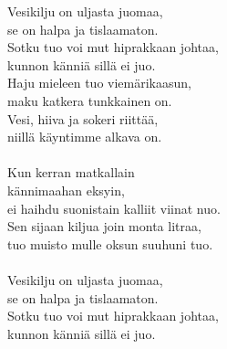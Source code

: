 
Vesikilju on uljasta juomaa, \\ se on halpa ja tislaamaton. \\ Sotku tuo voi mut hiprakkaan johtaa, \\ kunnon känniä sillä ei juo. \\ Haju mieleen tuo viemärikaasun, \\ maku katkera tunkkainen on. \\ Vesi, hiiva ja sokeri riittää, \\ niillä käyntimme alkava on. \\ \hspace{10mm} \\ Kun kerran matkallain \\ kännimaahan eksyin, \\ ei haihdu suonistain kalliit viinat nuo. \\ Sen sijaan kiljua join monta litraa, \\ tuo muisto mulle oksun suuhuni tuo. \\ \hspace{10mm} \\ Vesikilju on uljasta juomaa, \\ se on halpa ja tislaamaton. \\ Sotku tuo voi mut hiprakkaan johtaa, \\ kunnon känniä sillä ei juo.